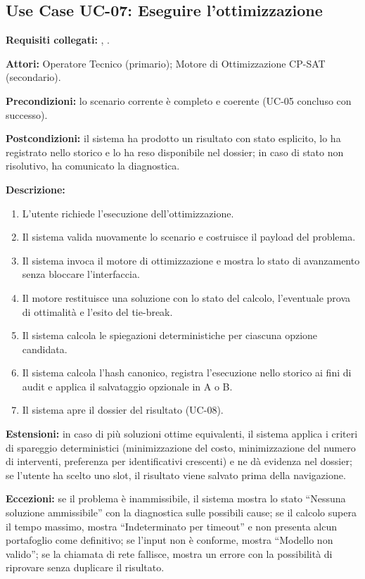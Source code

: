 \subsection*{Use Case UC-07: Eseguire l'ottimizzazione}
\textbf{Requisiti collegati:} , .\par
\textbf{Attori:} Operatore Tecnico (primario); Motore di Ottimizzazione CP-SAT (secondario).\par
\textbf{Precondizioni:} lo scenario corrente è completo e coerente (UC-05 concluso con successo).\par
\textbf{Postcondizioni:} il sistema ha prodotto un risultato con stato esplicito, lo ha registrato nello storico e lo ha reso disponibile nel dossier; in caso di stato non risolutivo, ha comunicato la diagnostica.\par
\textbf{Descrizione:}
\begin{enumerate}[leftmargin=1.6em, itemsep=0.1em]
    \item L'utente richiede l'esecuzione dell'ottimizzazione.
    \item Il sistema valida nuovamente lo scenario e costruisce il payload del problema.
    \item Il sistema invoca il motore di ottimizzazione e mostra lo stato di avanzamento senza bloccare l'interfaccia.
    \item Il motore restituisce una soluzione con lo stato del calcolo, l'eventuale prova di ottimalità e l'esito del tie-break.
    \item Il sistema calcola le spiegazioni deterministiche per ciascuna opzione candidata.
    \item Il sistema calcola l'hash canonico, registra l'esecuzione nello storico ai fini di audit e applica il salvataggio opzionale in A o B.
    \item Il sistema apre il dossier del risultato (UC-08).
\end{enumerate}
\textbf{Estensioni:} in caso di più soluzioni ottime equivalenti, il sistema applica i criteri di spareggio deterministici (minimizzazione del costo, minimizzazione del numero di interventi, preferenza per identificativi crescenti) e ne dà evidenza nel dossier; se l'utente ha scelto uno slot, il risultato viene salvato prima della navigazione.\par
\textbf{Eccezioni:} se il problema è inammissibile, il sistema mostra lo stato ``Nessuna soluzione ammissibile'' con la diagnostica sulle possibili cause; se il calcolo supera il tempo massimo, mostra ``Indeterminato per timeout'' e non presenta alcun portafoglio come definitivo; se l'input non è conforme, mostra ``Modello non valido''; se la chiamata di rete fallisce, mostra un errore con la possibilità di riprovare senza duplicare il risultato.

